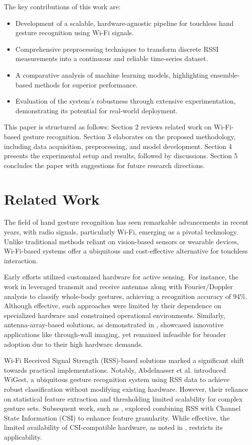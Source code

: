 \documentclass[10pt,twocolumn,letterpaper]{article}
\begin{document}
The key contributions of this work are:
\begin{itemize}
    \item Development of a scalable, hardware-agnostic pipeline for touchless hand gesture recognition using Wi-Fi signals.
    \item Comprehensive preprocessing techniques to transform discrete RSSI measurements into a continuous and reliable time-series dataset.
    \item A comparative analysis of machine learning models, highlighting ensemble-based methods for superior performance.
    \item Evaluation of the system's robustness through extensive experimentation, demonstrating its potential for real-world deployment.
\end{itemize}

This paper is structured as follows: Section 2 reviews related work on Wi-Fi-based gesture recognition. Section 3 elaborates on the proposed methodology, including data acquisition, preprocessing, and model development. Section 4 presents the experimental setup and results, followed by discussions. Section 5 concludes the paper with suggestions for future research directions.


\section{Related Work}\label{sec:related}

The field of hand gesture recognition has seen remarkable advancements in recent years, with radio signals, particularly Wi-Fi, emerging as a pivotal technology. Unlike traditional methods reliant on vision-based sensors or wearable devices, Wi-Fi-based systems offer a ubiquitous and cost-effective alternative for touchless interaction.

Early efforts utilized customized hardware for active sensing. For instance, the work in \cite{sensor_based} leveraged transmit and receive antennas along with Fourier/Doppler analysis to classify whole-body gestures, achieving a recognition accuracy of 94\%. Although effective, such approaches were limited by their dependence on specialized hardware and constrained operational environments. Similarly, antenna-array-based solutions, as demonstrated in \cite{antenna_array}, showcased innovative applications like through-wall imaging, yet remained infeasible for broader adoption due to their high hardware demands.

Wi-Fi Received Signal Strength (RSS)-based solutions marked a significant shift towards practical implementations. Notably, Abdelnasser et al. \cite{abdelnasser2015wifi} introduced WiGest, a ubiquitous gesture recognition system using RSS data to achieve robust classification without modifying existing hardware. However, their reliance on statistical feature extraction and thresholding limited scalability for complex gesture sets. Subsequent work, such as \cite{rss_csi}, explored combining RSS with Channel State Information (CSI) to enhance feature granularity. While effective, the limited availability of CSI-compatible hardware, as noted in \cite{haseeb2020wisture}, restricts its applicability.
\end{document}
